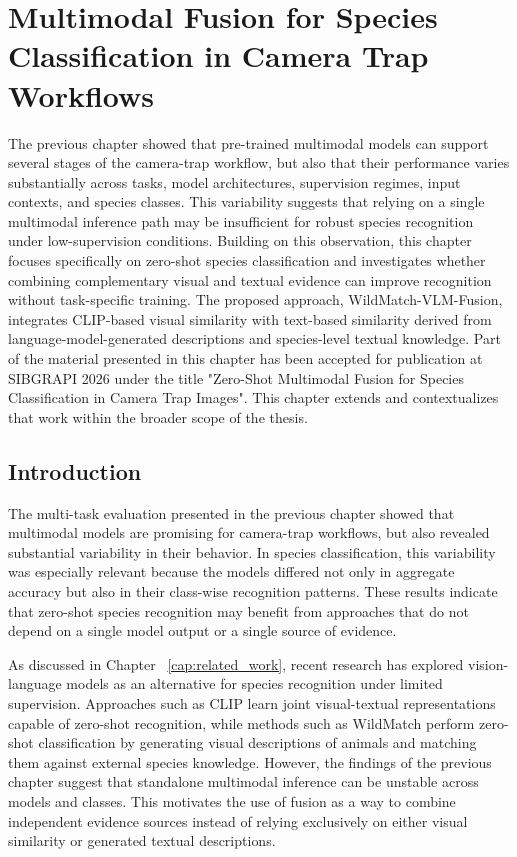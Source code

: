 \chapter{Multimodal Fusion for Species Classification in Camera Trap Workflows}\label{cap:experiment_02}

The previous chapter showed that pre-trained multimodal models can support several stages of the camera-trap workflow, but also that their performance varies substantially across tasks, model architectures, supervision regimes, input contexts, and species classes. This variability suggests that relying on a single multimodal inference path may be insufficient for robust species recognition under low-supervision conditions. Building on this observation, this chapter focuses specifically on zero-shot species classification and investigates whether combining complementary visual and textual evidence can improve recognition without task-specific training. The proposed approach, WildMatch-VLM-Fusion, integrates CLIP-based visual similarity with text-based similarity derived from language-model-generated descriptions and species-level textual knowledge. Part of the material presented in this chapter has been accepted for publication at SIBGRAPI 2026 under the title "Zero-Shot Multimodal Fusion for Species Classification in Camera Trap Images". This chapter extends and contextualizes that work within the broader scope of the thesis.

\section{Introduction}
The multi-task evaluation presented in the previous chapter showed that multimodal models are promising for camera-trap workflows, but also revealed substantial variability in their behavior. In species classification, this variability was especially relevant because the models differed not only in aggregate accuracy but also in their class-wise recognition patterns. These results indicate that zero-shot species recognition may benefit from approaches that do not depend on a single model output or a single source of evidence.

As discussed in Chapter ~\ref{cap:related_work}, recent research has explored vision-language models as an alternative for species recognition under limited supervision. Approaches such as CLIP learn joint visual-textual representations capable of zero-shot recognition, while methods such as WildMatch perform zero-shot classification by generating visual descriptions of animals and matching them against external species knowledge. However, the findings of the previous chapter suggest that standalone multimodal inference can be unstable across models and classes. This motivates the use of fusion as a way to combine independent evidence sources instead of relying exclusively on either visual similarity or generated textual descriptions.

